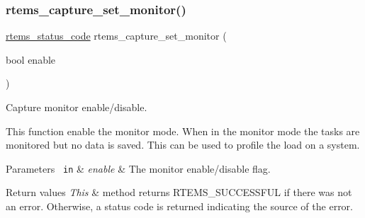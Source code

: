 \subsubsection{\texorpdfstring{rtems\_capture\_set\_monitor()}{rtems\_capture\_set\_monitor()}}
{\footnotesize\ttfamily \mbox{\hyperlink{group__ClassicStatus_ga545d41846817eaba6143d52ee4d9e9fe}{rtems\+\_\+status\+\_\+code}} rtems\+\_\+capture\+\_\+set\+\_\+monitor (\begin{DoxyParamCaption}\item[{bool}]{enable }\end{DoxyParamCaption})}



Capture monitor enable/disable. 

This function enable the monitor mode. When in the monitor mode the tasks are monitored but no data is saved. This can be used to profile the load on a system.


\begin{DoxyParams}[1]{Parameters}
\mbox{\texttt{ in}}  & {\em enable} & The monitor enable/disable flag.\\
\hline
\end{DoxyParams}

\begin{DoxyRetVals}{Return values}
{\em This} & method returns R\+T\+E\+M\+S\+\_\+\+S\+U\+C\+C\+E\+S\+S\+F\+UL if there was not an error. Otherwise, a status code is returned indicating the source of the error. \\
\hline
\end{DoxyRetVals}
\mbox{\label{group__libmisc__capture_ga98931dad73347565d0b528bee300df70}} 
